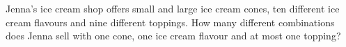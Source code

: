 Jenna's ice cream shop offers small and large ice cream cones, ten different ice cream flavours and nine different toppings. How many different combinations does Jenna sell with one cone, one ice cream flavour and at most one topping?
